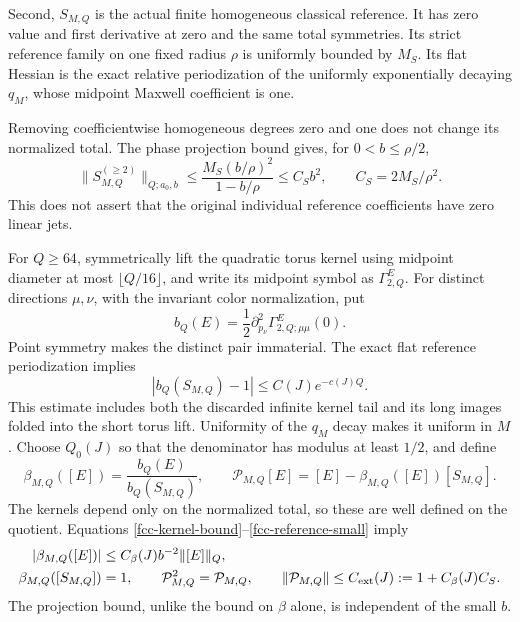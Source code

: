 Second, \(S_{M,Q}\) is the actual finite homogeneous classical
reference. It has zero value and first derivative at zero and
the same total symmetries. Its strict reference family on one
fixed radius \(\rho\) is uniformly bounded by \(M_S\). Its flat
Hessian is the exact relative periodization of the uniformly
exponentially decaying \(q_M\), whose midpoint Maxwell
coefficient is one.

Removing coefficientwise homogeneous degrees zero and one
does not change its normalized total. The phase projection
bound gives, for \(0<b\le\rho/2\),
\begin{equation}
 \|S_{M,Q}^{(\ge2)}\|_{Q;a_0,b}
 \le \frac{M_S(b/\rho)^2}{1-b/\rho}
 \le C_S b^2,\qquad C_S=2M_S/\rho^2.
 \label{fcc-reference-small}
\end{equation}
This does not assert that the original individual reference
coefficients have zero linear jets.

For \(Q\ge64\), symmetrically lift the quadratic torus kernel
using midpoint diameter at most \(\lfloor Q/16\rfloor\), and
write its midpoint symbol as \(\Gamma^E_{2,Q}\). For distinct
directions \(\mu,\nu\), with the invariant color normalization,
put
\begin{equation}
 b_Q(E)=\frac12
       \partial_{p_\nu}^2\Gamma^E_{2,Q;\mu\mu}(0).
 \label{fcc-cutoff-jet}
\end{equation}
Point symmetry makes the distinct pair immaterial. The exact
flat reference periodization implies
\begin{equation}
 |b_Q(S_{M,Q})-1|\le C(J)e^{-c(J)Q}.
 \label{fcc-reference-denominator}
\end{equation}
This estimate includes both the discarded infinite kernel
tail and its long images folded into the short torus lift.
Uniformity of the \(q_M\) decay makes it uniform in \(M\).
Choose \(Q_0(J)\) so that the denominator has modulus at least
\(1/2\), and define
\begin{equation}
 \beta_{M,Q}([E])
     =\frac{b_Q(E)}{b_Q(S_{M,Q})},
 \qquad
 \mathcal P_{M,Q}[E]
     =[E]-\beta_{M,Q}([E])[S_{M,Q}].
 \label{fcc-projection}
\end{equation}
The kernels depend only on the normalized total, so these
are well defined on the quotient. Equations
\eqref{fcc-kernel-bound}--\eqref{fcc-reference-small} imply
\begin{align}
 |\beta_{M,Q}([E])|
     &\le C_\beta(J)b^{-2}\|[E]\|_Q,\notag\\
 \beta_{M,Q}([S_{M,Q}])&=1,\qquad
 \mathcal P_{M,Q}^2=\mathcal P_{M,Q},\qquad
 \|\mathcal P_{M,Q}\|\le C_{\rm ext}(J)
       :=1+C_\beta(J)C_S.
 \label{fcc-projection-bound}
\end{align}
The projection bound, unlike the bound on \(\beta\) alone,
is independent of the small \(b\).

